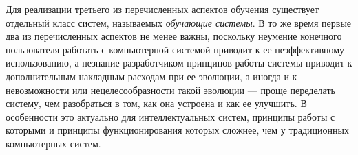 Для реализации третьего из перечисленных аспектов обучения существует отдельный класс систем, называемых \textit{обучающие системы}. В то же время первые два из перечисленных аспектов не менее важны, поскольку неумение конечного пользователя работать с компьютерной системой приводит к ее неэффективному использованию, а незнание разработчиком принципов работы системы приводит к дополнительным накладным расходам при ее эволюции, а иногда и к невозможности или нецелесообразности такой эволюции --- проще переделать систему, чем разобраться в том, как она устроена и как ее улучшить. В особенности это актуально для интеллектуальных систем, принципы работы с которыми и принципы функционирования которых сложнее, чем у традиционных компьютерных систем.

\vspace{-\baselineskip}


